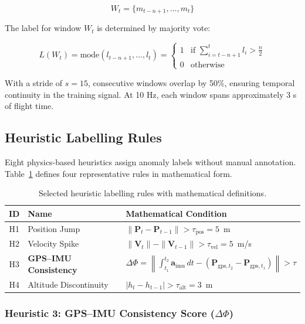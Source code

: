 \documentclass[11pt,a4paper]{article}
\begin{document}
\begin{equation}
    W_t = \{ m_{t-n+1}, \dots, m_t \}
\end{equation}

The label for window $W_t$ is determined by majority vote:

\begin{equation}
    L(W_t) = \text{mode}(l_{t-n+1}, \dots, l_t) =
    \begin{cases}
        1 & \text{if } \sum_{i=t-n+1}^{t} l_i > \frac{n}{2} \\
        0 & \text{otherwise}
    \end{cases}
\end{equation}

With a stride of $s = 15$, consecutive windows overlap by 50\%, ensuring temporal continuity in the training signal. At 10 Hz, each window spans approximately 3 s of flight time.

\subsection{Heuristic Labelling Rules}

Eight physics-based heuristics assign anomaly labels without manual annotation. Table~\ref{tab:heuristics} defines four representative rules in mathematical form.

\begin{table}[H]
\centering
\caption{Selected heuristic labelling rules with mathematical definitions.}
\label{tab:heuristics}
\begin{tabular}{@{}clp{7cm}@{}}
\toprule
\textbf{ID} & \textbf{Name} & \textbf{Mathematical Condition} \\
\midrule
H1 & Position Jump & $\| \mathbf{P}_{t} - \mathbf{P}_{t-1} \| > \tau_{\text{pos}} = 5$~m \\
H2 & Velocity Spike & $\| \mathbf{V}_{t} \| - \| \mathbf{V}_{t-1} \| > \tau_{\text{vel}} = 5$~m/s \\
H3 & \textbf{GPS--IMU Consistency} & $\Delta \Phi = \left\| \int_{t_1}^{t_2} \mathbf{a}_{\text{imu}} \, dt - (\mathbf{P}_{\text{gps}, t_2} - \mathbf{P}_{\text{gps}, t_1}) \right\| > \tau$ \\
H4 & Altitude Discontinuity & $| h_{t} - h_{t-1} | > \tau_{\text{alt}} = 3$~m \\
\bottomrule
\end{tabular}
\end{table}

\subsubsection{Heuristic 3: GPS--IMU Consistency Score ($\Delta \Phi$)}
\end{document}

